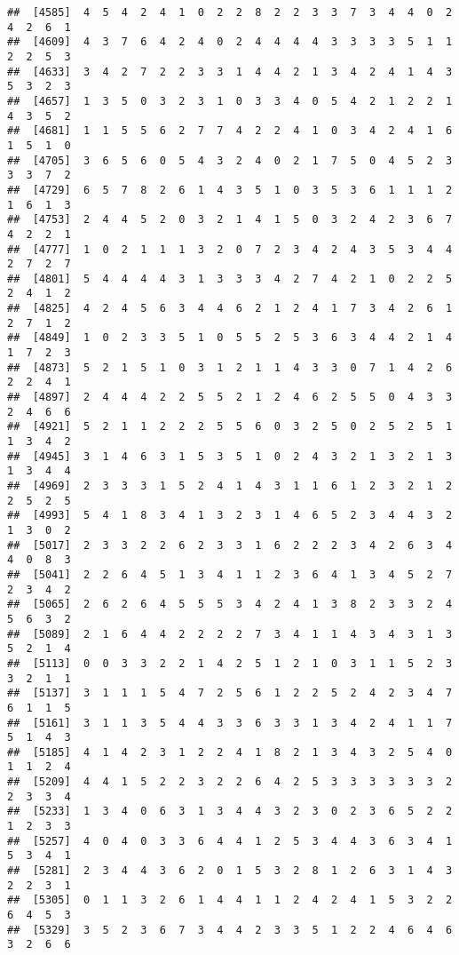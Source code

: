 \documentclass[
]{article}
\begin{document}
\begin{verbatim}
##  [4585]  4  5  4  2  4  1  0  2  2  8  2  2  3  3  7  3  4  4  0  2  4  2  6  1
##  [4609]  4  3  7  6  4  2  4  0  2  4  4  4  4  3  3  3  3  5  1  1  2  2  5  3
##  [4633]  3  4  2  7  2  2  3  3  1  4  4  2  1  3  4  2  4  1  4  3  5  3  2  3
##  [4657]  1  3  5  0  3  2  3  1  0  3  3  4  0  5  4  2  1  2  2  1  4  3  5  2
##  [4681]  1  1  5  5  6  2  7  7  4  2  2  4  1  0  3  4  2  4  1  6  1  5  1  0
##  [4705]  3  6  5  6  0  5  4  3  2  4  0  2  1  7  5  0  4  5  2  3  3  3  7  2
##  [4729]  6  5  7  8  2  6  1  4  3  5  1  0  3  5  3  6  1  1  1  2  1  6  1  3
##  [4753]  2  4  4  5  2  0  3  2  1  4  1  5  0  3  2  4  2  3  6  7  4  2  2  1
##  [4777]  1  0  2  1  1  1  3  2  0  7  2  3  4  2  4  3  5  3  4  4  2  7  2  7
##  [4801]  5  4  4  4  4  3  1  3  3  3  4  2  7  4  2  1  0  2  2  5  2  4  1  2
##  [4825]  4  2  4  5  6  3  4  4  6  2  1  2  4  1  7  3  4  2  6  1  2  7  1  2
##  [4849]  1  0  2  3  3  5  1  0  5  5  2  5  3  6  3  4  4  2  1  4  1  7  2  3
##  [4873]  5  2  1  5  1  0  3  1  2  1  1  4  3  3  0  7  1  4  2  6  2  2  4  1
##  [4897]  2  4  4  4  2  2  5  5  2  1  2  4  6  2  5  5  0  4  3  3  2  4  6  6
##  [4921]  5  2  1  1  2  2  2  5  5  6  0  3  2  5  0  2  5  2  5  1  1  3  4  2
##  [4945]  3  1  4  6  3  1  5  3  5  1  0  2  4  3  2  1  3  2  1  3  1  3  4  4
##  [4969]  2  3  3  3  1  5  2  4  1  4  3  1  1  6  1  2  3  2  1  2  2  5  2  5
##  [4993]  5  4  1  8  3  4  1  3  2  3  1  4  6  5  2  3  4  4  3  2  1  3  0  2
##  [5017]  2  3  3  2  2  6  2  3  3  1  6  2  2  2  3  4  2  6  3  4  4  0  8  3
##  [5041]  2  2  6  4  5  1  3  4  1  1  2  3  6  4  1  3  4  5  2  7  2  3  4  2
##  [5065]  2  6  2  6  4  5  5  5  3  4  2  4  1  3  8  2  3  3  2  4  5  6  3  2
##  [5089]  2  1  6  4  4  2  2  2  2  7  3  4  1  1  4  3  4  3  1  3  5  2  1  4
##  [5113]  0  0  3  3  2  2  1  4  2  5  1  2  1  0  3  1  1  5  2  3  3  2  1  1
##  [5137]  3  1  1  1  5  4  7  2  5  6  1  2  2  5  2  4  2  3  4  7  6  1  1  5
##  [5161]  3  1  1  3  5  4  4  3  3  6  3  3  1  3  4  2  4  1  1  7  5  1  4  3
##  [5185]  4  1  4  2  3  1  2  2  4  1  8  2  1  3  4  3  2  5  4  0  1  1  2  4
##  [5209]  4  4  1  5  2  2  3  2  2  6  4  2  5  3  3  3  3  3  3  2  2  3  3  4
##  [5233]  1  3  4  0  6  3  1  3  4  4  3  2  3  0  2  3  6  5  2  2  1  2  3  3
##  [5257]  4  0  4  0  3  3  6  4  4  1  2  5  3  4  4  3  6  3  4  1  5  3  4  1
##  [5281]  2  3  4  4  3  6  2  0  1  5  3  2  8  1  2  6  3  1  4  3  2  2  3  1
##  [5305]  0  1  1  3  2  6  1  4  4  1  1  2  4  2  4  1  5  3  2  2  6  4  5  3
##  [5329]  3  5  2  3  6  7  3  4  4  2  3  3  5  1  2  2  4  6  4  6  3  2  6  6

\end{verbatim}
\end{document}
